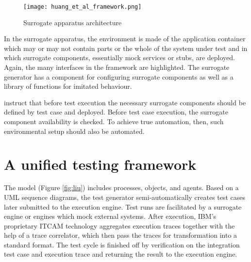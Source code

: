 \documentclass[12pt,a4paper,oneside,pdftex]{report}
\begin{document}
\begin{figure}[H]
  \begin{center}
    \texttt{[image: huang\_et\_al\_framework.png]}
    \caption{Surrogate apparatus architecture \citep{huang2008surrogate}}
    \label{fig:huang}
  \end{center}
\end{figure}


\begin{comment}
\begin{figure}[H]
  \begin{center}
    \texttt{[image: huang\_testing\_process.png]}
    \caption{The testing processes by \citet{huang2008surrogate}}
    \label{fig:huangtesting} 
  \end{center}
\end{figure}
\end{comment}

In the surrogate apparatus, the environment is made of the application container which may or may not contain parts or the whole of the system under test and in which surrogate components, essentially mock services or stubs, are deployed. Again, the many interfaces in the framework are highlighted. The surrogate generator has a component for configuring surrogate components as well as a library of functions for imitated behaviour.

\citet{huang2008surrogate} instruct that before test execution the necessary surrogate components should be defined by test case and deployed. Before test case execution, the surrogate component availability is checked. To achieve true automation, then, such environmental setup should also be automated.


\section{A unified testing framework}

The \citet{liu2009unified} model (Figure \ref{fig:liu}) includes processes, objects, and agents. Based on a UML sequence diagrams, the test generator semi-automatically creates test cases later submitted to the execution engine. Test runs are facilitated by a surrogate engine or engines which mock external systems. After execution, IBM's proprietary ITCAM technology aggregates execution traces together with the help of a trace correlator, which then pass the traces for transformation into a standard format. The test cycle is finished off by verification on the integration test case and execution trace and returning the result to the execution engine.
\end{document}
